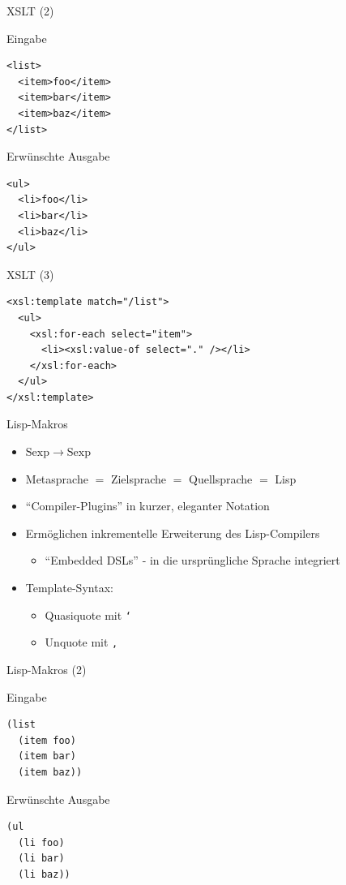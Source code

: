 \documentclass{beamer}
\newcommand\ato{\rightarrow} %
\begin{document}
\begin{frame}[fragile]{XSLT (2)}

  \begin{block}{Eingabe}
\begin{verbatim}
<list>
  <item>foo</item>
  <item>bar</item>
  <item>baz</item>
</list>
\end{verbatim}
  \end{block}
  \begin{block}{Erwünschte Ausgabe}
\begin{verbatim}
<ul>
  <li>foo</li>
  <li>bar</li>
  <li>baz</li>
</ul>
\end{verbatim}
\end{block}
\end{frame}

\begin{frame}[fragile]{XSLT (3)}
\begin{verbatim}
<xsl:template match="/list">
  <ul>
    <xsl:for-each select="item">
      <li><xsl:value-of select="." /></li>
    </xsl:for-each>
  </ul>
</xsl:template>
\end{verbatim}
\end{frame}

\begin{frame}[fragile]{Lisp-Makros}
  \begin{itemize}
  \item $\mathrm{Sexp} \ato \mathrm{Sexp}$
  \item Metasprache $=$ Zielsprache $=$ Quellsprache $=$ Lisp
  \item ``Compiler-Plugins'' in kurzer, eleganter Notation
  \item Ermöglichen inkrementelle Erweiterung des Lisp-Compilers
    \begin{itemize}
    \item ``Embedded DSLs'' - in die ursprüngliche Sprache
      integriert
    \end{itemize}
  \item Template-Syntax:
    \begin{itemize}
    \item Quasiquote mit \texttt{`}  
    \item Unquote mit \texttt{,}  
    \end{itemize}
  \end{itemize}
\end{frame}

\begin{frame}[fragile]{Lisp-Makros (2)}
  \begin{block}{Eingabe}
\begin{verbatim}
(list
  (item foo)
  (item bar)
  (item baz))
\end{verbatim}
  \end{block}
  \begin{block}{Erwünschte Ausgabe}
\begin{verbatim}
(ul
  (li foo)
  (li bar)
  (li baz))
\end{verbatim}
  \end{block}
\end{frame}
\end{document}
